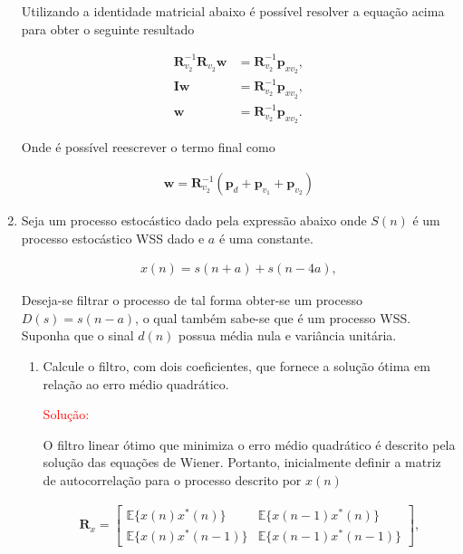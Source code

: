 \documentclass[a4paper,10pt]{article}
\begin{document}
\begin{enumerate}
				Utilizando a identidade matricial abaixo é possível resolver a equação acima para obter o seguinte resultado
				
				\begin{align}
					\mathbf{R}^{-1}_{v_{2}}\mathbf{R}_{v_{2}} \mathbf{w} &= \mathbf{R}^{-1}_{v_{2}}\mathbf{p}_{xv_{2}}, \\
					\mathbf{I}\mathbf{w} &= \mathbf{R}^{-1}_{v_{2}}\mathbf{p}_{xv_{2}}, \\ 
					\mathbf{w} &= \mathbf{R}^{-1}_{v_{2}}\mathbf{p}_{xv_{2}}. 
				\end{align}
				
				Onde é possível reescrever o termo final como
				
				\begin{align}
					\mathbf{w} = \mathbf{R}^{-1}_{v_{2}}(\mathbf{p}_{d} + \mathbf{p}_{v_{1}} + \mathbf{p}_{v_{2}}) 
				\end{align}
			
			\item Seja um processo estocástico dado pela expressão abaixo onde $S(n)$ é um processo estocástico WSS dado e $a$ é uma constante.
			
				\begin{align*}
					x(n) = s(n + a) + s(n-4a),
				\end{align*}
				
				Deseja-se filtrar o processo de tal forma obter-se um processo $D(s) = s(n -a)$, o qual também sabe-se que é um processo WSS. Suponha que o sinal $d(n)$ possua média nula e variância unitária.
			
				\begin{enumerate}
					
					\item Calcule o filtro, com dois coeficientes, que fornece a solução ótima em relação ao erro médio quadrático.
					
						\textcolor{red}{Solução:}

						O filtro linear ótimo que minimiza o erro médio quadrático é descrito pela solução das equações de Wiener. Portanto, inicialmente definir a matriz de autocorrelação para o processo descrito por $x(n)$

						\begin{align} 
							\mathbf{R}_{x} = 
							\begin{bmatrix}
								\mathbb{E}\{x(n)x^{*}(n)\} & \mathbb{E}\{x(n-1)x^{*}(n)\} \\
								\mathbb{E}\{x(n)x^{*}(n-1)\}  & \mathbb{E}\{x(n-1)x^{*}(n-1)\} 
							\end{bmatrix},
						\end{align}
					

\end{enumerate}
\end{enumerate}
\end{document}
